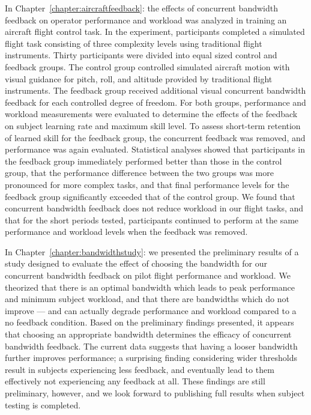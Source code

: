 In Chapter~\ref{chapter:aircraftfeedback}:  the effects of concurrent bandwidth feedback on operator performance and workload was analyzed in training an aircraft flight control task.
In the experiment, participants completed a simulated flight task consisting of three complexity levels using traditional flight instruments.
Thirty participants were divided into equal sized control and feedback groups.
The control group controlled simulated aircraft motion with visual guidance for pitch, roll, and altitude provided by traditional flight instruments.
The feedback group received additional visual concurrent bandwidth feedback for each controlled degree of freedom.
For both groups, performance and workload measurements were evaluated to determine the effects of the feedback on subject learning rate and maximum skill level.
To assess short-term retention of learned skill for the feedback group, the concurrent feedback was removed, and performance was again evaluated.
Statistical analyses showed that participants in the feedback group immediately performed better than those in the control group, that the performance difference between the two groups was more pronounced for more complex tasks, and that final performance levels for the feedback group significantly exceeded that of the control group.
We found that concurrent bandwidth feedback does not reduce workload in our flight tasks, and that for the short periods tested, participants continued to perform at the same performance and workload levels when the feedback was removed.

In Chapter~\ref{chapter:bandwidthstudy}:  we presented the preliminary results of a study designed to evaluate the effect of choosing the bandwidth for our concurrent bandwidth feedback on pilot flight performance and workload.
We theorized that there is an optimal bandwidth which leads to peak performance and minimum subject workload, and that there are bandwidths which do not improve --- and can actually degrade performance and workload compared to a no feedback condition.
Based on the preliminary findings presented, it appears that choosing an appropriate bandwidth determines the efficacy of concurrent bandwidth feedback.
The current data suggests that having a looser bandwidth further improves performance; a surprising finding considering wider thresholds result in subjects experiencing less feedback, and eventually lead to them effectively not experiencing any feedback at all.
These findings are still preliminary, however, and we look forward to publishing full results when subject testing is completed.


